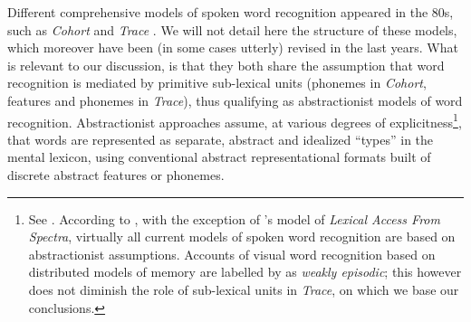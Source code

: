 Different comprehensive models of spoken word recognition appeared in the 80s, such as \textit{Cohort} \citep{marslen1980temporal} and \textit{Trace} \citep{mcclelland1986trace}. We will not detail here the structure of these models, which moreover have been (in some cases utterly) revised in the last years. What is relevant to our discussion, is that they both share the assumption that word recognition is mediated by primitive sub-lexical units (phonemes in \textit{Cohort}, features and phonemes in \textit{Trace}), thus qualifying as abstractionist models of word recognition. Abstractionist approaches assume, at various degrees of explicitness\footnote{See \citet{licklider1952process, peterson1952information, lindgren1965machine}. According to \citet{luce2005spoken}, with the exception of \citeauthor{klatt1979speech}'s \citeyear{klatt1979speech} model of \textit{Lexical Access From Spectra}, virtually all current models of spoken word recognition are based on abstractionist assumptions. Accounts of visual word recognition based on distributed models of memory \citep{mcclelland1985distributed} are labelled by \citet{tenpenny1995abstractionist} as \textit{weakly episodic}; this however does not diminish the role of sub-lexical units in \textit{Trace}, on which we base our conclusions.}, that words are represented as separate, abstract and idealized ``types'' in the mental lexicon, using conventional abstract representational formats built of discrete abstract features or phonemes.

